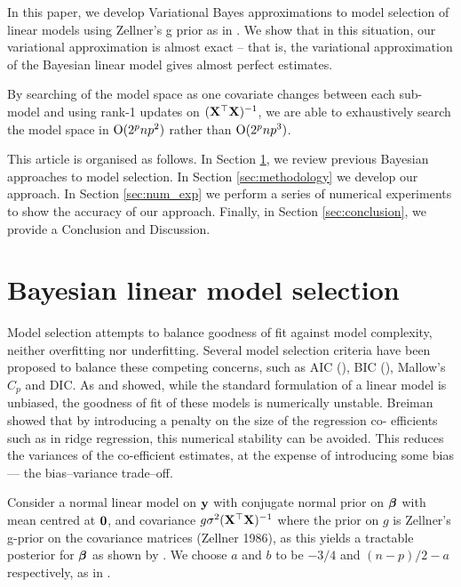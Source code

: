 \documentclass{amsart}[12pt]
\begin{document}


In this paper, we develop Variational Bayes approximations to model selection of linear models using Zellner's
g prior as in \cite{Liang2008}. We show that in this situation, our variational approximation is almost exact
-- that is, the variational approximation of the Bayesian linear model gives almost perfect estimates.

By searching of the model space as one covariate changes between each sub-model and  using rank-1 updates on
$({\bf X}^\top {\bf X})^{-1}$, we are able to exhaustively search the model space in $\text{O}(2^p np^2)$ rather than
$\text{O}(2^p np^3)$.

This article is organised as follows. In Section \ref{sec:model_selection}, we review previous Bayesian
approaches to model selection. In Section \ref{sec:methodology} we develop our approach. In Section
\ref{sec:num_exp} we perform a series of numerical experiments to show the accuracy of our approach. Finally,
in Section \ref{sec:conclusion}, we provide a Conclusion and Discussion.

\section{Bayesian linear model selection}
\label{sec:model_selection}

Model selection attempts to balance goodness of fit against model complexity, neither overfitting nor
underfitting. Several model selection criteria have been proposed to balance these competing concerns, such as
AIC (\cite{DeLeeuw1992}), BIC (\cite{Schwarz1978}), Mallow's $C_p$ and DIC. As \cite{Breiman1996} and
\cite{Efron2013} showed, while  the standard formulation of a linear model is unbiased, the goodness of fit of
these models is numerically  unstable. Breiman showed that by introducing a penalty on the size of the
regression co- efficients such as  in ridge regression, this numerical stability can be avoided. This reduces
the variances of the co-efficient estimates, at the expense of introducing some bias --- the bias--variance
trade--off.

Consider a normal linear model on ${\bf y}$ with conjugate normal prior on ${\boldsymbol \beta}$ with mean centred at ${\bf 0}$,
and covariance $g \sigma^2 ({\bf X}^\top {\bf X})^{-1}$ where the prior on $g$ is Zellner's g-prior on the covariance
matrices (Zellner 1986), as this yields a tractable posterior for ${\boldsymbol \beta}$ as shown by \cite{Liang2008}. We
choose $a$  and $b$ to be $-3/4$ and $(n - p)/2 - a$ respectively, as in \cite{Maruyama2011}.
\end{document}
